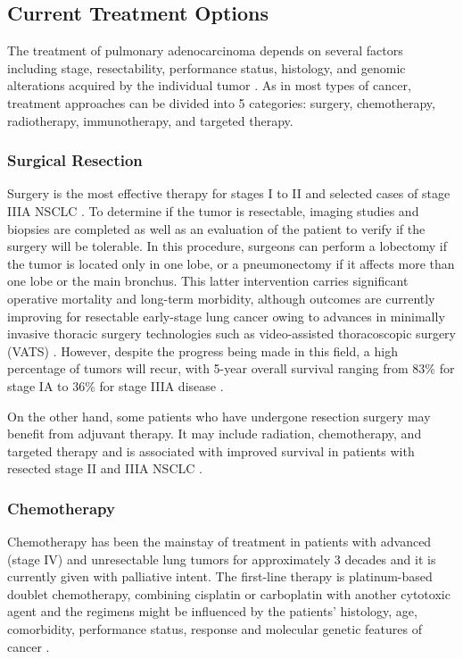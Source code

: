\subsection{Current Treatment Options}

The treatment of pulmonary adenocarcinoma depends on several factors including stage, resectability, performance status, histology, and genomic alterations acquired by the individual tumor \cite{NSCLC}. As in most types of cancer, treatment approaches can be divided into 5 categories: surgery, chemotherapy, radiotherapy, immunotherapy, and targeted therapy.

\subsubsection{Surgical Resection}

Surgery is the most effective therapy for stages I to II and selected cases of stage IIIA NSCLC \cite{NSCLC_therapies}. To determine if the tumor is resectable, imaging studies and biopsies are completed as well as an evaluation of the patient to verify if the surgery will be tolerable. In this procedure, surgeons can perform a lobectomy if the tumor is located only in one lobe, or a pneumonectomy if it affects more than one lobe or the main bronchus. This latter intervention carries significant operative mortality and long-term morbidity, although outcomes are currently improving for resectable early-stage lung cancer owing to advances in minimally invasive thoracic surgery technologies such as video-assisted thoracoscopic surgery (VATS) \cite{VATS}. However, despite the progress being made in this field, a high percentage of tumors will recur, with 5-year overall survival ranging from 83\% for stage IA to 36\% for stage IIIA disease \cite{TNM_proposal}.

On the other hand, some patients who have undergone resection surgery may benefit from adjuvant therapy. It may include radiation, chemotherapy, and targeted therapy and is associated with improved survival in patients with resected stage II and IIIA NSCLC \cite{Adjuvant}.

\subsubsection{Chemotherapy}

Chemotherapy has been the mainstay of treatment in patients with advanced (stage IV) and unresectable lung tumors for approximately 3 decades and it is currently given with palliative intent. The first-line therapy is platinum-based doublet chemotherapy, combining cisplatin or carboplatin with another cytotoxic agent and the regimens might be influenced by the patients' histology, age, comorbidity, performance status, response and molecular genetic features of cancer \cite{NSCLC_therapies}.

